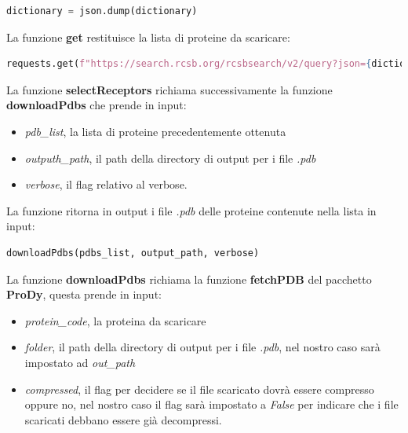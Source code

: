 \begin{lstlisting}[language=Python, label=lst:code15, caption={funzione json.dump}]
dictionary = json.dump(dictionary)
\end{lstlisting}

La funzione \textbf{get} restituisce la lista di proteine da scaricare:

\begin{lstlisting}[language=Python, label=lst:code16, caption={funzione requests.get}]
requests.get(f"https://search.rcsb.org/rcsbsearch/v2/query?json={dictionary}")
\end{lstlisting}

La funzione \textbf{selectReceptors} richiama successivamente la funzione \textbf{downloadPdbs} che prende in input:

\begin{itemize}
    \item \textit{pdb\_list}, la lista di proteine precedentemente ottenuta
    \item \textit{outputh\_path}, il path della directory di output per i file \textit{.pdb}
    \item \textit{verbose}, il flag relativo al verbose.
\end{itemize}

La funzione ritorna in output i file \textit{.pdb} delle proteine contenute nella lista in input:

\begin{lstlisting}[language=Python, label=lst:code17, caption={funzione downloadPdbs}]
downloadPdbs(pdbs_list, output_path, verbose)
\end{lstlisting}

La funzione \textbf{downloadPdbs} richiama la funzione \textbf{fetchPDB} del pacchetto \textbf{ProDy}, questa prende in input:

\begin{itemize}
    \item \textit{protein\_code}, la proteina da scaricare
    \item \textit{folder}, il path della directory di output per i file \textit{.pdb}, nel nostro caso sarà impostato ad \textit{out\_path}
    \item \textit{compressed}, il flag per decidere se il file scaricato dovrà essere compresso oppure no, nel nostro caso il flag sarà impostato a \textit{False} per indicare che i file scaricati debbano essere già decompressi.
\end{itemize}

